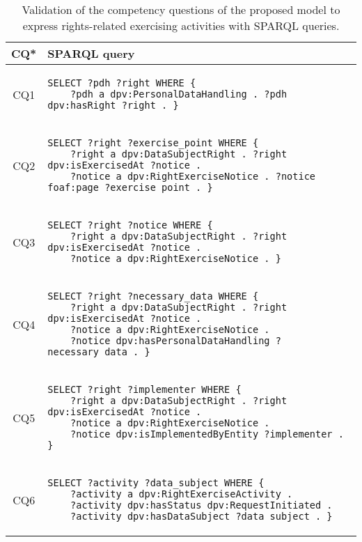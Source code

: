 \begin{table}[htp]
    \centering
    \caption{Validation of the competency questions of the proposed model to express rights-related exercising activities with SPARQL queries.}
    \label{tab:rights_cq_sparql}
    \begin{tabular}{c|l}
        \textbf{CQ*} & \textbf{SPARQL query} \\
        \hline\hline
        CQ1 & \begin{lstlisting}[numbers=none]
SELECT ?pdh ?right WHERE {
    ?pdh a dpv:PersonalDataHandling . ?pdh dpv:hasRight ?right . } \end{lstlisting} \\
        \hline
        CQ2 & \begin{lstlisting}[numbers=none]
SELECT ?right ?exercise_point WHERE {
    ?right a dpv:DataSubjectRight . ?right dpv:isExercisedAt ?notice . 
    ?notice a dpv:RightExerciseNotice . ?notice foaf:page ?exercise_point . } \end{lstlisting} \\
        \hline
        CQ3 & \begin{lstlisting}[numbers=none]
SELECT ?right ?notice WHERE {
    ?right a dpv:DataSubjectRight . ?right dpv:isExercisedAt ?notice . 
    ?notice a dpv:RightExerciseNotice . } \end{lstlisting} \\
        \hline
        CQ4 & \begin{lstlisting}[numbers=none]
SELECT ?right ?necessary_data WHERE {
    ?right a dpv:DataSubjectRight . ?right dpv:isExercisedAt ?notice . 
    ?notice a dpv:RightExerciseNotice .
    ?notice dpv:hasPersonalDataHandling ?necessary_data . } \end{lstlisting} \\
        \hline
        CQ5 & \begin{lstlisting}[numbers=none]
SELECT ?right ?implementer WHERE {
    ?right a dpv:DataSubjectRight . ?right dpv:isExercisedAt ?notice . 
    ?notice a dpv:RightExerciseNotice .
    ?notice dpv:isImplementedByEntity ?implementer . } \end{lstlisting} \\
        \hline
        CQ6 & \begin{lstlisting}[numbers=none]
SELECT ?activity ?data_subject WHERE {
    ?activity a dpv:RightExerciseActivity .
    ?activity dpv:hasStatus dpv:RequestInitiated . 
    ?activity dpv:hasDataSubject ?data_subject . } \end{lstlisting} \\

\end{tabular}
\end{table}
